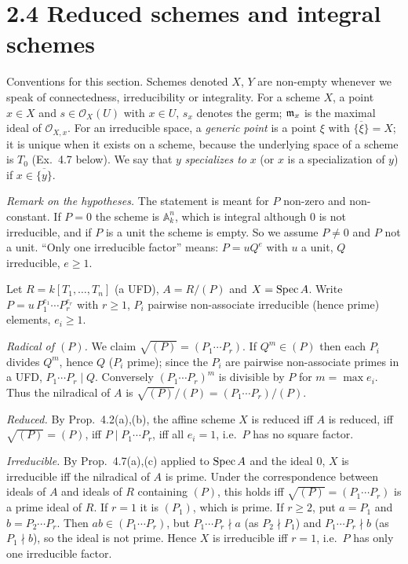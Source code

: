 \documentclass[11pt]{article}
\begin{document}
\section*{2.4 Reduced schemes and integral schemes}

Conventions for this section. Schemes denoted $X$, $Y$ are non-empty whenever we speak of connectedness, irreducibility or integrality. For a scheme $X$, a point $x\in X$ and $s\in\mathcal O_X(U)$ with $x\in U$, $s_x$ denotes the germ; $\mathfrak m_x$ is the maximal ideal of $\mathcal O_{X,x}$. For an irreducible space, a \emph{generic point} is a point $\xi$ with $\overline{\{\xi\}}=X$; it is unique when it exists on a scheme, because the underlying space of a scheme is $T_0$ (Ex.~4.7 below). We say that $y$ \emph{specializes to} $x$ (or $x$ is a specialization of $y$) if $x\in\overline{\{y\}}$.

\pf
\emph{Remark on the hypotheses.} The statement is meant for $P$ non-zero and non-constant. If $P=0$ the scheme is $\mathbb A^n_k$, which is integral although $0$ is not irreducible, and if $P$ is a unit the scheme is empty. So we assume $P\neq 0$ and $P$ not a unit. ``Only one irreducible factor'' means: $P=uQ^e$ with $u$ a unit, $Q$ irreducible, $e\ge1$.

Let $R=k[T_1,\dots,T_n]$ (a UFD), $A=R/(P)$ and $X=\operatorname{Spec} A$. Write $P=u\,P_1^{e_1}\cdots P_r^{e_r}$ with $r\ge1$, $P_i$ pairwise non-associate irreducible (hence prime) elements, $e_i\ge1$.

\emph{Radical of $(P)$.} We claim $\sqrt{(P)}=(P_1\cdots P_r)$. If $Q^m\in(P)$ then each $P_i$ divides $Q^m$, hence $Q$ ($P_i$ prime); since the $P_i$ are pairwise non-associate primes in a UFD, $P_1\cdots P_r\mid Q$. Conversely $(P_1\cdots P_r)^{m}$ is divisible by $P$ for $m=\max e_i$. Thus the nilradical of $A$ is $\sqrt{(P)}/(P)=(P_1\cdots P_r)/(P)$.

\emph{Reduced.} By Prop.~4.2(a),(b), the affine scheme $X$ is reduced iff $A$ is reduced, iff $\sqrt{(P)}=(P)$, iff $P\mid P_1\cdots P_r$, iff all $e_i=1$, i.e.\ $P$ has no square factor.

\emph{Irreducible.} By Prop.~4.7(a),(c) applied to $\operatorname{Spec} A$ and the ideal $0$, $X$ is irreducible iff the nilradical of $A$ is prime. Under the correspondence between ideals of $A$ and ideals of $R$ containing $(P)$, this holds iff $\sqrt{(P)}=(P_1\cdots P_r)$ is a prime ideal of $R$. If $r=1$ it is $(P_1)$, which is prime. If $r\ge2$, put $a=P_1$ and $b=P_2\cdots P_r$. Then $ab\in(P_1\cdots P_r)$, but $P_1\cdots P_r\nmid a$ (as $P_2\nmid P_1$) and $P_1\cdots P_r\nmid b$ (as $P_1\nmid b$), so the ideal is not prime. Hence $X$ is irreducible iff $r=1$, i.e.\ $P$ has only one irreducible factor.
\end{document}
